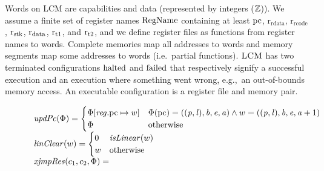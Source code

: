 \documentclass[acmsmall,screen]{acmart}\settopmatter{}
\renewcommand{\RegName}{\shareddom{RegName}}
\renewcommand{\decInstr}[1]{\plainfun{decode}{#1}}
\renewcommand{\updPcAddr}[1]{\plainfun{updPc}{#1}}
\renewcommand{\linCons}[1]{\plainfun{linClear}{#1}}
\renewcommand{\perm}{\var{p}}
\renewcommand{\rretc}{\mathrm{r}_{\mathrm{rcode}}}
\renewcommand{\rretd}{\mathrm{r}_{\mathrm{rdata}}}
\newcommand{\xjmpres}[1]{\plainfun{xjmpRes}{#1}}
\newcommand{\trgcm}{\textsc{LCM}}
\begin{document}
Words on \trgcm{} are capabilities and data (represented by integers ($\mathbb{Z}$)).
We assume a finite set of register names $\RegName$ containing at least $\mathrm{pc}$, $\rretd$, $\rretc$, $\mathrm{r}_\mathrm{stk}$, $\mathrm{r}_\mathrm{data}$, $\mathrm{r}_\mathrm{t1}$, and $\mathrm{r}_\mathrm{t2}$, and we define register files as functions from register names to words.
Complete memories map all addresses to words and memory segments map some addresses to words (i.e.\ partial functions).
$\trgcm{}$ has two terminated configurations $\mathrm{halted}$ and $\mathrm{failed}$ that respectively signify a successful execution and an execution where something went wrong, e.g.,\ an out-of-bounds memory access.
An executable configuration is a register file and memory pair.

\begin{figure}[p]
  \centering
  \[
    \begin{array}{l}
  \updPcAddr{\Phi} =
  \begin{cases}
    \Phi\updReg{\pcreg}{w} & \Phi(\pcreg) = ((\perm,\lin),\baddr,\eaddr,\aaddr) \wedge w = ((\perm,\lin),\baddr,\eaddr,\aaddr+1)\\
    \Phi  & \totherwise
  \end{cases}\\
  \linCons{w} =
  \begin{cases}
    0 & \isLinear{w} \\
    w & \totherwise
  \end{cases}\\
  \xjmpres{c_1,c_2,\Phi} =

\end{array}\]
\end{figure}
\end{document}
